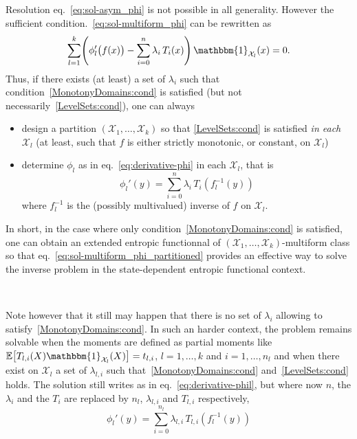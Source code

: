 \documentclass[entropy,article,submit,moreauthors,pdftex]{Definitions/mdpi}
\newcommand{\SZ}[1]{{\color{blue} #1}}                                       %
\def\X{\mathcal{X}}%
\def\un{\mathbbm{1}}%
\newcommand{\Esp}[1]{\mathbb{E}\left[ #1 \right]}%
\begin{document}
Resolution  eq.~\eqref{eq:sol-asym_phi}  is  not  possible  in  all  generality.
However the sufficient  condition.~\eqref{eq:sol-multiform_phi} can be rewritten
as
%
\begin{equation}\label{eq:sol-multiform_phi_partitioned}
\sum_{l=1}^k \left( \phi_l'\big(f(x)\big) - \sum_{i=0}^n \lambda_i \, T_i(x)
\right) \, \un_{\X_l}(x) = 0.
\end{equation}
%
Thus,   if  there   exists  (at   least)  a   set  of   $\lambda_i$  such   that
condition~\ref{MonotonyDomains:cond}       is      satisfied       (but      not
necessarily~\ref{LevelSets:cond}), one can always
%
\begin{itemize}
\item design  a partition  $(\X_1,\ldots,\X_k)$ so that  \ref{LevelSets:cond} is
  satisfied {\em  in each $\X_l$}  (at least, such  that $f$ is  either strictly
  monotonic, or constant, on $\X_l$)
%
\item  determine $\phi_l$  as in  eq.~\eqref{eq:derivative-phi} in  each $\X_l$,
  that is
  \begin{equation}\label{eq:derivative-phil}
  \phi_l'(y) = \sum_{i=0}^n \lambda_i \, T_i \left(f_l^{-1}(y)\right)
  \end{equation}
  where $f_l^{-1}$ is the (possibly multivalued) inverse of $f$ on $\X_l$.
\end{itemize}

In  short,  in  the  case  where  only  condition~\ref{MonotonyDomains:cond}  is
satisfied,   one    can   obtain    an   extended   entropic    functionnal   of
$(\X_1,\ldots,\X_k)$-multiform             class             so             that
eq.~\eqref{eq:sol-multiform_phi_partitioned} provides an  effective way to solve
the inverse problem in the state-dependent entropic functional context.

\

Note  however that  it still  may happen  that there  is no  set of  $\lambda_i$
allowing to satisfy~\ref{MonotonyDomains:cond}.  In  such an harder context, the
problem remains  solvable when the moments  are defined as partial  moments like
$\Esp{T_{l,i}(X) \un_{\X_l}(X)} =  t_{l,i}$, $l = 1 ,  \ldots , k$ and $i  = 1 ,
\ldots ,  n_l$ and  when there  exist on  $\X_l$ a  set of  $\lambda_{l,i}$ such
that~\ref{MonotonyDomains:cond}  and~\ref{LevelSets:cond}  holds.  The  solution
still  writes  as in  eq.~\eqref{eq:derivative-phil},  but  where now  $n$,  the
$\lambda_i$ and the  $T_i$ are replaced by $n_l$,  $\lambda_{l,i}$ and $T_{l,i}$
respectively,
%
\SZ{
\begin{equation}\label{eq:derivative-phil-partial}
\phi_l'(y) = \sum_{i=0}^{n_l} \lambda_{l,i} \, T_{l,i} \left(f_l^{-1}(y)\right)
\end{equation}
}
\end{document}
